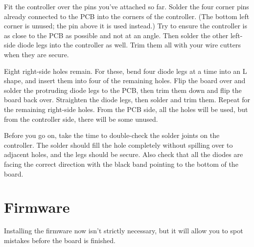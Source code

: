 \documentclass{article}
\begin{document}
Fit the controller over the pins you've attached so far. Solder the
four corner pins already connected to the PCB into the corners of the
controller. (The bottom left corner is unused; the pin above it is used
instead.) Try to ensure the controller is as close to the PCB as
possible and not at an angle. Then solder the other left-side diode
legs into the controller as well. Trim them all with your wire
cutters when they are secure.

\vspace{1em}

Eight right-side holes remain. For these, bend four diode legs at a
time into an L shape, and insert them into four of the remaining
holes. Flip the board over and solder the protruding diode legs to the
PCB, then trim them down and flip the board back over. Straighten the
diode legs, then solder and trim them. Repeat for the remaining
right-side holes. From the PCB side, all the holes will be used, but
from the controller side, there will be some unused.

\vspace{1em}
\noindent{}
\vspace{1em}

Before you go on, take the time to double-check the solder joints on
the controller. The solder should fill the hole completely without
spilling over to adjacent holes, and the legs should be secure. Also
check that all the diodes are facing the correct direction with the
black band pointing to the bottom of the board.

\section{Firmware}

Installing the firmware now isn't strictly necessary, but it will
allow you to spot mistakes before the board is finished.
\end{document}
